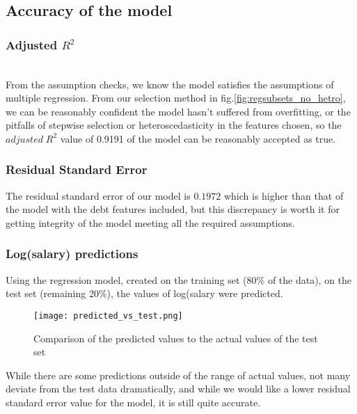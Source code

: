 \documentclass[journal]{IEEEtran}
\begin{document}
\subsection{Accuracy of the model}
\subsubsection{Adjusted $R^2$}\\
From the assumption checks, we know the model satisfies the assumptions of multiple regression. From our selection method in fig.\ref{fig:regsubsets_no_hetro}, we can be reasonably confident the model hasn't suffered from overfitting, or the pitfalls of stepwise selection or heteroscedasticity in the features chosen, so the $adjusted \; R^2$ value of 0.9191 of the model can be reasonably accepted as true.  
\subsubsection{Residual Standard Error}
The residual standard error of our model is $0.1972$ which is higher than that of the model with the debt features included, but this discrepancy is worth it for getting integrity of the model meeting all the required assumptions.
\subsubsection{Log(salary) predictions}\label{predictions}
Using the regression model, created on the training set (80\% of the data), on the test set (remaining 20\%), the values of log(salary were predicted. 
\begin{figure}[h]
    \centering
    \texttt{[image: predicted\_vs\_test.png]}
    \caption{Comparison of the predicted values to the actual values of the test set}
    \label{fig:pred_vs_act}
\end{figure}
While there are some predictions outside of the range of actual values, not many deviate from the test data dramatically, and while we would like a lower residual standard error value for the model, it is still quite accurate.  
\end{document}
